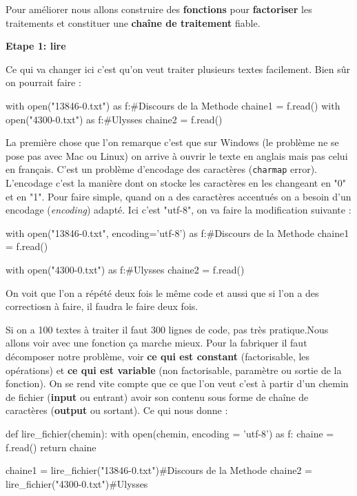  Pour améliorer nous allons construire des \textbf{fonctions} pour \textbf{factoriser} les traitements et constituer une \textbf{chaîne de traitement} fiable.

\textbf{Etape 1: lire}

Ce qui va changer ici c'est qu'on veut traiter plusieurs textes facilement. Bien sûr on pourrait faire :

\begin{python}
with open("13846-0.txt") as f:#Discours de la Methode
  chaine1 = f.read()
with open("4300-0.txt") as f:#Ulysses
  chaine2 = f.read()
\end{python}
 La première chose que l'on remarque c'est que sur Windows (le problème ne se pose pas avec Mac ou Linux) on arrive à ouvrir le texte en anglais mais pas celui en français. C'est un problème d'encodage des caractères (\texttt{charmap} error). L'encodage c'est la manière dont on stocke les caractères en les changeant en "0" et en "1".
 Pour faire simple, quand on a des caractères accentués on a besoin d'un encodage (\textit{encoding}) adapté. Ici c'est "utf-8", on va faire la modification suivante :
\begin{python}
with open("13846-0.txt", encoding='utf-8') as f:#Discours de la Methode
  chaine1 = f.read()

with open("4300-0.txt") as f:#Ulysses
  chaine2 = f.read()
\end{python}

 On voit que l'on a répété deux fois le même code et aussi que si l'on a des correctiosn à faire, il faudra le faire deux fois.

 Si on a 100 textes à traiter il faut 300 lignes de code, pas très pratique.Nous allons voir avec une fonction ça marche mieux. Pour la fabriquer il faut décomposer notre problème, voir \textbf{ce qui est constant} (factorisable, les opérations) et \textbf{ce qui est variable} (non factorisable, paramètre ou sortie de la fonction).
 On se rend vite compte que ce que l'on veut c'est à partir d'un chemin de fichier (\textbf{input} ou entrant) avoir son contenu sous forme de chaîne de caractères (\textbf{output} ou sortant). Ce qui nous donne :

\begin{python}
def lire_fichier(chemin):
  with open(chemin, encoding = 'utf-8') as f:
    chaine = f.read()
  return chaine

chaine1 = lire_fichier("13846-0.txt")#Discours de la Methode
chaine2 = lire_fichier("4300-0.txt")#Ulysses

\end{python}

